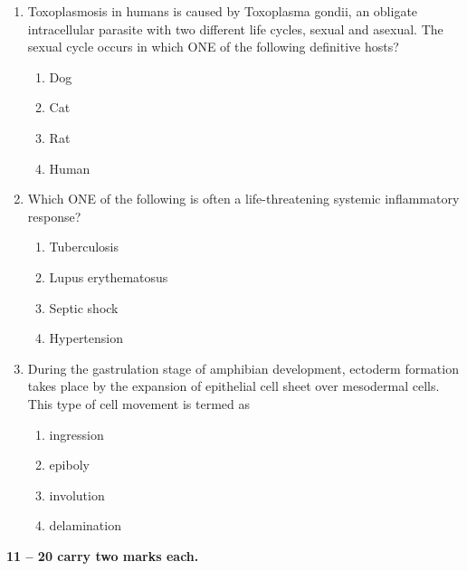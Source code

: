 \documentclass[journal,12pt,onecolumn]{IEEEtran}
\begin{document}
\begin{enumerate}[label=\arabic*.]
\item Toxoplasmosis in humans is caused by Toxoplasma gondii, an obligate intracellular parasite with two different life cycles, sexual and asexual.  The sexual cycle occurs in which ONE of the following definitive hosts?

\begin{multicols}{4}
\begin{enumerate}[label=(\Alph*)]
\item Dog
\item Cat
\item Rat
\item Human
\end{enumerate}
\end{multicols}

\item Which ONE of the following is often a life-threatening systemic inflammatory response?

\begin{multicols}{2}
\begin{enumerate}[label=(\Alph*)]
\item Tuberculosis
\item Lupus erythematosus
\item Septic shock
\item Hypertension
\end{enumerate}
\end{multicols}

\item During the gastrulation stage of amphibian development, ectoderm formation takes place by the expansion of epithelial cell sheet over mesodermal cells. This type of cell movement is termed as

\begin{multicols}{4}
\begin{enumerate}[label=(\Alph*)]
\item ingression
\item epiboly
\item involution
\item delamination
\end{enumerate}
\end{multicols}

\end{enumerate}

\vspace{0.5cm}
\noindent \textbf{ 11 -- 20 carry two marks each.}
\end{document}

